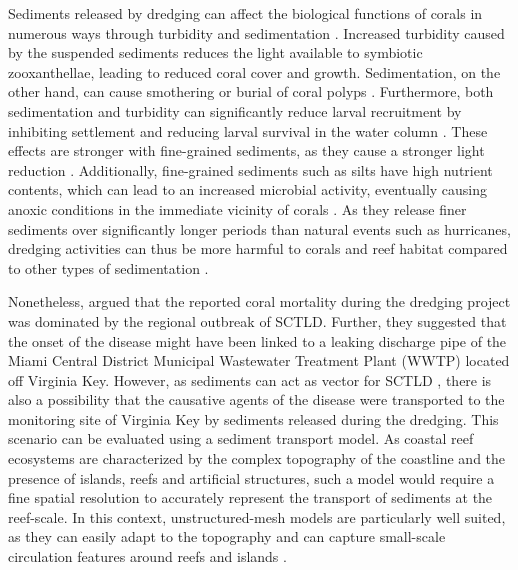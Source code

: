 \documentclass[preprint,12pt,authoryear]{elsarticle}
\begin{document}
Sediments released by dredging can affect the biological functions of corals in numerous ways  through turbidity and sedimentation \citep{erftemeijer2012environmental,jones2015effects}. Increased turbidity caused by the suspended sediments reduces the light available to symbiotic zooxanthellae, leading to reduced coral cover and growth. Sedimentation, on the other hand, can cause smothering or burial of coral polyps \citep{erftemeijer2012environmental,jones2015effects,jones2019sediment}. Furthermore, both sedimentation and turbidity can significantly reduce larval recruitment by inhibiting settlement and reducing larval survival in the water column \citep{jones2015effects}. These effects are stronger with fine-grained sediments, as they cause a stronger light reduction \citep{storlazzi2015influence,fourney2017additive}. Additionally, fine-grained sediments such as silts have high nutrient contents, which can lead to an increased microbial activity, eventually causing anoxic conditions in the immediate vicinity of corals \citep{weber2012mechanisms}. As they release finer sediments over significantly longer periods than natural events such as hurricanes, dredging activities can thus be more harmful to corals and reef habitat compared to other types of sedimentation \citep{cunning2019extensive}.

Nonetheless, \cite{gintert2019regional} argued that the reported coral mortality during the dredging project was dominated by the regional outbreak of SCTLD. Further, they suggested that the onset of the disease might have been linked to a leaking discharge pipe of the Miami Central District Municipal Wastewater Treatment Plant (WWTP) located off Virginia Key. However, as sediments can act as vector for SCTLD \citep{studivan2022reef}, there is also a possibility that the causative agents of the disease were transported to the monitoring site of Virginia Key by sediments released during the dredging. This scenario can be evaluated using a sediment transport model. As coastal reef ecosystems are characterized by the complex topography of the coastline and the presence of islands, reefs and artificial structures, such a model would require a fine spatial resolution to accurately represent the transport of sediments at the reef-scale. In this context, unstructured-mesh models are particularly well suited, as they can easily adapt to the topography \citep{fringer2019future} and can capture small-scale circulation features around reefs and islands \citep{lambrechts2008multi}.
\end{document}
